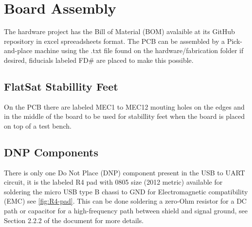 %
%
%
%
%

%
%
%
%
%
%

\chapter{Board Assembly}

The hardware project has the Bill of Material (BOM) avalaible at its GitHub repository in excel spreeadsheets format. The PCB can be assembled by a Pick-and-place machine using the .txt file found on the hardware/fabrication folder if desired, fiducials labeled FD\# are placed to make this possible.

\section{FlatSat Stabillity Feet}

On the PCB there are labeled MEC1 to MEC12 mouting holes on the edges and in the middle of the board to be used for stabillity feet when the board is placed on top of a test bench.

\section{DNP Components}

There is only one Do Not Place (DNP) component present in the USB to UART circuit, it is the labeled R4 pad with 0805 size (2012 metric) available for soldering the micro USB type B chassi to GND for Electromagnetic compatibility (EMC) see \autoref{fig:R4-pad}. This can be done soldering a zero-Ohm resistor for a DC path or capacitor for a high-frequency path between shield and signal ground, see Section 2.2.2 of the document \cite{ftdi-usb-hardware-guidelines} for more details.

